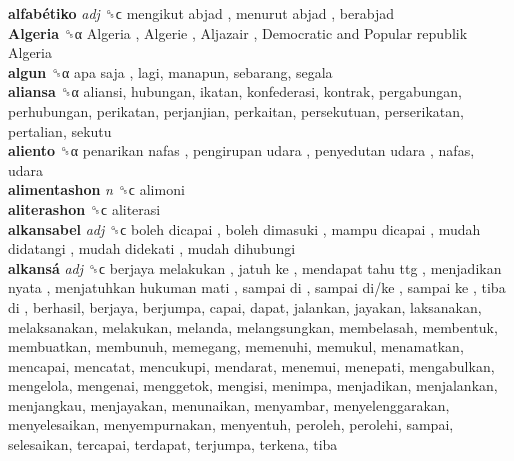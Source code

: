 \textbf{alfabétiko} \emph{adj}  ␝ϲ   mengikut abjad ,  menurut abjad , berabjad  \\
\textbf{Algeria} ␝α   Algeria ,  Algerie ,  Aljazair ,  Democratic and Popular republik Algeria   \\
\textbf{algun} ␝α   apa saja , lagi, manapun, sebarang, segala  \\
\textbf{aliansa} ␝α  aliansi, hubungan, ikatan, konfederasi, kontrak, pergabungan, perhubungan, perikatan, perjanjian, perkaitan, persekutuan, perserikatan, pertalian, sekutu  \\
\textbf{aliento} ␝α   penarikan nafas ,  pengirupan udara ,  penyedutan udara , nafas, udara  \\
\textbf{alimentashon} \emph{n}  ␝ϲ  alimoni  \\
\textbf{aliterashon} ␝ϲ  aliterasi  \\
\textbf{alkansabel} \emph{adj}  ␝ϲ   boleh dicapai ,  boleh dimasuki ,  mampu dicapai ,  mudah didatangi ,  mudah didekati ,  mudah dihubungi   \\
\textbf{alkansá} \emph{adj}  ␝ϲ   berjaya melakukan ,  jatuh ke ,  mendapat tahu ttg ,  menjadikan nyata ,  menjatuhkan hukuman mati ,  sampai di ,  sampai di/ke ,  sampai ke ,  tiba di , berhasil, berjaya, berjumpa, capai, dapat, jalankan, jayakan, laksanakan, melaksanakan, melakukan, melanda, melangsungkan, membelasah, membentuk, membuatkan, membunuh, memegang, memenuhi, memukul, menamatkan, mencapai, mencatat, mencukupi, mendarat, menemui, menepati, mengabulkan, mengelola, mengenai, menggetok, mengisi, menimpa, menjadikan, menjalankan, menjangkau, menjayakan, menunaikan, menyambar, menyelenggarakan, menyelesaikan, menyempurnakan, menyentuh, peroleh, perolehi, sampai, selesaikan, tercapai, terdapat, terjumpa, terkena, tiba  \\
